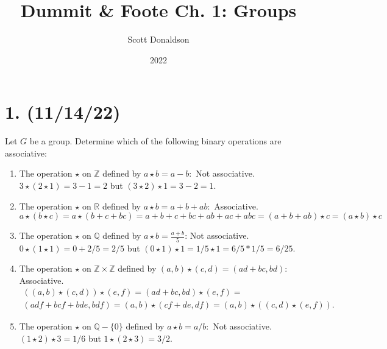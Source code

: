 \documentclass{article}
\title{Dummit \& Foote Ch. 1: Groups}
\author{Scott Donaldson}
\date{2022}
\begin{document}
\maketitle

\section*{1. (11/14/22)}

Let $G$ be a group. Determine which of the following binary operations are associative:

\begin{enumerate}[label=\alph*)]
    \item The operation $\star$ on $\mathbb{Z}$ defined by $a \star b = a - b:$\newline
          Not associative. $3 \star (2 \star 1) = 3 - 1 = 2$ but $(3 \star 2) \star 1 = 3 - 2 = 1$.
    \item The operation $\star$ on $\mathbb{R}$ defined by $a \star b = a + b + ab:$\newline
          Associative. 
          \begin{equation*}
            a \star (b \star c) = a \star (b + c + bc) = a + b + c + bc + ab + ac + abc =
            (a + b + ab) \star c = (a \star b) \star c
          \end{equation*}
    \item The operation $\star$ on $\mathbb{Q}$ defined by $a \star b = \frac{a + b}{5}$:\newline
          Not associative. $0 \star (1 \star 1) = 0 + 2/5 = 2/5$ but $(0 \star 1) \star 1 = 1/5 \star 1 = 6/5 * 1/5 = 6/25$.
    \item The operation $\star$ on $\mathbb{Z} \times \mathbb{Z}$ defined by $(a, b) \star (c, d) = (ad + bc, bd):$\newline
          Associative.
          \begin{multline*}
            ((a,b)\star(c,d))\star(e,f) = (ad + bc, bd)\star(e,f) = \\
            (adf + bcf + bde, bdf) = (a,b)\star(cf + de, df) = (a,b)\star((c,d)\star(e,f)).
          \end{multline*}
    \item The operation $\star$ on $\mathbb{Q} - \{0\}$ defined by $a \star b = a / b:$\newline
          Not associative. $(1 \star 2) \star 3 = 1/6$ but $1 \star (2 \star 3) = 3/2$.
\end{enumerate}
\end{document}
